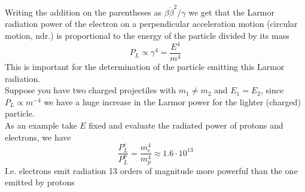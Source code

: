 \documentclass[../qm.tex]{subfiles}
\begin{document}
Writing the addition on the parentheses as $\beta\dot{\beta}^2/\gamma$ we get that the Larmor radiation power of the electron on a perpendicular acceleration motion (circular motion, ndr.) is proportional to the energy of the particle divided by its mass
\begin{equation*}
	P_L\propto\gamma^4=\frac{E^4}{m^4}
\end{equation*}
This is important for the determination of the particle emitting this Larmor radiation.\\
Suppose you have two charged projectiles with $m_1\ne m_2$ and $E_1=E_2$, since $P_L\propto m^{-4}$ we have a huge increase in the Larmor power for the lighter (charged) particle.\\
As an example take $E$ fixed and evaluate the radiated power of protons and electrons, we have
\begin{equation*}
	\frac{P_L^e}{P_L^p}=\frac{m_e^4}{m_p^4}\approx1.6\cdot10^{13}
\end{equation*}
I.e. electrons emit radiation 13 orders of magnitude more powerful than the one emitted by protons
\end{document}
